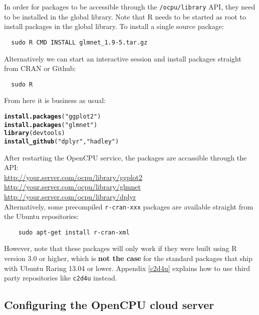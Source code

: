 \documentclass{scrartcl}\usepackage[]{graphicx}\usepackage[]{color}
\makeatletter
\newcommand{\hlstr}[1]{\textcolor[rgb]{0.192,0.494,0.8}{#1}}%
\newcommand{\hlstd}[1]{\textcolor[rgb]{0.345,0.345,0.345}{#1}}%
\newcommand{\hlkwd}[1]{\textcolor[rgb]{0.737,0.353,0.396}{\textbf{#1}}}%
\newenvironment{kframe}{%
 \def\at@end@of@kframe{}%
 \ifinner\ifhmode%
  \def\at@end@of@kframe{\end{minipage}}%
  \begin{minipage}{\columnwidth}%
 \fi\fi%
 \def\FrameCommand##1{\hskip\@totalleftmargin \hskip-\fboxsep
 \colorbox{shadecolor}{##1}\hskip-\fboxsep
     \hskip-\linewidth \hskip-\@totalleftmargin \hskip\columnwidth}%
 \MakeFramed {\advance\hsize-\width
   \@totalleftmargin\z@ \linewidth\hsize
   \@setminipage}}%
 {\par\unskip\endMakeFramed%
 \at@end@of@kframe}
\newenvironment{knitrout}{}{} %
\makeatother
\begin{document}
In order for packages to be accessible through the \texttt{/ocpu/library} API, they need to be installed in the global library. Note that R needs to be started as root to install packages in the global library. To install a single source package:
\begin{verbatim}
  sudo R CMD INSTALL glmnet_1.9-5.tar.gz
\end{verbatim}
Alternatively we can start an interactive session and install packages straight from CRAN or Github:
\begin{verbatim}
  sudo R
\end{verbatim}
From here it is business as usual:
\begin{knitrout}
\color{fgcolor}\begin{kframe}
\begin{alltt}
\hlkwd{install.packages}\hlstd{(}\hlstr{"ggplot2"}\hlstd{)}
\hlkwd{install.packages}\hlstd{(}\hlstr{"glmnet"}\hlstd{)}
\hlkwd{library}\hlstd{(devtools)}
\hlkwd{install_github}\hlstd{(}\hlstr{"dplyr"}\hlstd{,} \hlstr{"hadley"}\hlstd{)}
\end{alltt}
\end{kframe}
\end{knitrout}

\noindent After restarting the OpenCPU service, the packages are accassible through the API:\\

\indent \url{http://your.server.com/ocpu/library/ggplot2} \\
\indent \url{http://your.server.com/ocpu/library/glmnet} \\
\indent \url{http://your.server.com/ocpu/library/dplyr} \\

\noindent Alternatively, some precompiled \texttt{r-cran-xxx} packages are available straight from the Ubuntu repositories:
\begin{verbatim}
    sudo apt-get install r-cran-xml
\end{verbatim}
However, note that these packages will only work if they were built using R version 3.0 or higher, which is \textbf{not the case} for the standard packages that ship with Ubuntu Raring 13.04 or lower. Appendix \ref{c2d4u} explains how to use third party repositories like \texttt{c2d4u} instead.

\subsection{Configuring the OpenCPU cloud server}
\end{document}
